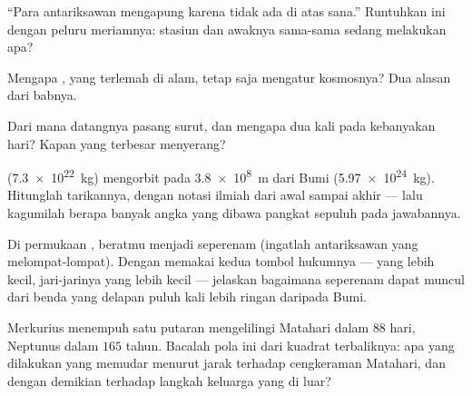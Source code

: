\begin{exercise}[$\star$]\label{exo:g9:gravitation:6}
``Para antariksawan mengapung karena tidak ada  di atas
sana.'' Runtuhkan ini dengan peluru meriamnya: stasiun dan awaknya
sama-sama sedang melakukan apa?
\end{exercise}

\begin{exercise}[$\star$]\label{exo:g9:gravitation:7}
Mengapa , yang terlemah di alam, tetap saja mengatur
kosmosnya? Dua alasan dari babnya.
\end{exercise}

\begin{exercise}[$\star$]\label{exo:g9:gravitation:8}
Dari mana datangnya pasang surut, dan mengapa dua kali pada
kebanyakan hari? Kapan yang terbesar menyerang?
\end{exercise}

\begin{exercise}[$\star\star$]\label{exo:g9:gravitation:9}
 (\qty{7.3e22}{kg}) mengorbit pada \qty{3.8e8}{m} dari Bumi
(\qty{5.97e24}{kg}). Hitunglah tarikannya, dengan notasi ilmiah dari
awal sampai akhir --- lalu kagumilah berapa banyak angka yang dibawa
pangkat sepuluh pada jawabannya.
\end{exercise}

\begin{exercise}[$\star\star$]\label{exo:g9:gravitation:10}
Di permukaan , beratmu  menjadi seperenam (ingatlah
antariksawan yang melompat-lompat). Dengan memakai kedua tombol
hukumnya ---   yang lebih kecil, jari-jarinya yang lebih
kecil --- jelaskan bagaimana seperenam dapat muncul dari benda yang
delapan puluh kali lebih ringan daripada Bumi.
\end{exercise}

\begin{exercise}[$\star\star$]\label{exo:g9:gravitation:11}
Merkurius menempuh satu putaran mengelilingi Matahari dalam $88$ hari,
Neptunus dalam $165$ tahun. Bacalah pola ini dari kuadrat terbaliknya:
apa yang dilakukan  yang memudar menurut jarak terhadap
cengkeraman Matahari, dan dengan demikian terhadap langkah keluarga
yang di luar?
\end{exercise}

